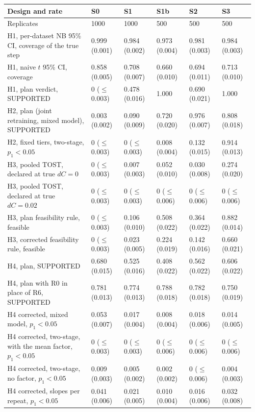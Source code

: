 \begin{tabular}{@{}>{\raggedright\arraybackslash}p{4.7cm} lllll@{}}
\toprule
Design and rate & S0 & S1 & S1b & S2 & S3 \\
\midrule
Replicates & 1000 & 1000 & 500 & 500 & 500 \\
H1, per-dataset NB 95\% CI, coverage of the true step & 0.999 (0.001) & 0.984 (0.002) & 0.973 (0.004) & 0.981 (0.003) & 0.984 (0.003) \\
H1, naive $t$ 95\% CI, coverage & 0.858 (0.005) & 0.708 (0.007) & 0.660 (0.010) & 0.694 (0.011) & 0.713 (0.010) \\
H1, plan verdict, SUPPORTED & 0 ($\le$0.003) & 0.478 (0.016) & 1.000 & 0.690 (0.021) & 1.000 \\
H2, plan (joint retraining, mixed model), SUPPORTED & 0.003 (0.002) & 0.090 (0.009) & 0.720 (0.020) & 0.976 (0.007) & 0.808 (0.018) \\
H2, fixed tiers, two-stage, $p_1<0.05$ & 0 ($\le$0.003) & 0 ($\le$0.003) & 0.008 (0.004) & 0.132 (0.015) & 0.914 (0.013) \\
H3, pooled TOST, declared at true $dC=0$ & 0 ($\le$0.003) & 0.007 (0.003) & 0.052 (0.010) & 0.030 (0.008) & 0.274 (0.020) \\
H3, pooled TOST, declared at true $dC=0.02$ & 0 ($\le$0.003) & 0 ($\le$0.003) & 0 ($\le$0.006) & 0 ($\le$0.006) & 0 ($\le$0.006) \\
H3, plan feasibility rule, feasible & 0 ($\le$0.003) & 0.106 (0.010) & 0.508 (0.022) & 0.364 (0.022) & 0.882 (0.014) \\
H3, corrected feasibility rule, feasible & 0 ($\le$0.003) & 0.023 (0.005) & 0.224 (0.019) & 0.142 (0.016) & 0.660 (0.021) \\
H4, plan, SUPPORTED & 0.680 (0.015) & 0.525 (0.016) & 0.408 (0.022) & 0.562 (0.022) & 0.606 (0.022) \\
H4, plan with R0 in place of R6, SUPPORTED & 0.781 (0.013) & 0.774 (0.013) & 0.788 (0.018) & 0.782 (0.018) & 0.750 (0.019) \\
H4 corrected, mixed model, $p_1<0.05$ & 0.053 (0.007) & 0.017 (0.004) & 0.008 (0.004) & 0.018 (0.006) & 0.014 (0.005) \\
H4 corrected, two-stage, with the mean factor, $p_1<0.05$ & 0 ($\le$0.003) & 0 ($\le$0.003) & 0 ($\le$0.006) & 0 ($\le$0.006) & 0 ($\le$0.006) \\
H4 corrected, two-stage, no factor, $p_1<0.05$ & 0.009 (0.003) & 0.005 (0.002) & 0.002 (0.002) & 0 ($\le$0.006) & 0.004 (0.003) \\
H4 corrected, slopes per repeat, $p_1<0.05$ & 0.041 (0.006) & 0.021 (0.005) & 0.010 (0.004) & 0.016 (0.006) & 0.032 (0.008) \\

\end{tabular}
